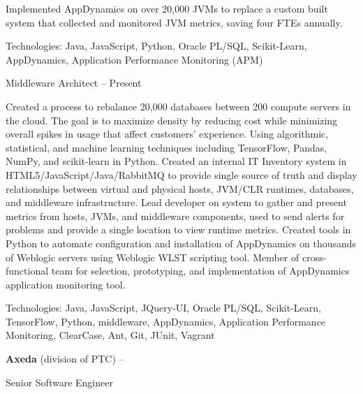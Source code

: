 \documentclass[letterpaper,MMMMyyyy,nonstopmode]{simpleresumecv}
\newif\ifLOCATION
\begin{document}
\begin{Body}
\begin{Detail}
\BulletItem
Implemented AppDynamics on over 20,000 JVMs to replace a custom built system that collected and monitored JVM metrics, saving four FTEs annually.

\Gap
Technologies: Java, JavaScript, Python, Oracle PL/SQL, Scikit-Learn, AppDynamics, Application Performance Monitoring (APM)
\end{Detail}

\BigGap

\iffalse %
\Entry
\href{http://www.paychex.com/}
{\textbf{Paychex}}
\ifLOCATION
\hfill 
Rochester, New York
\fi

Middleware Architect
\hfill
{} --
Present

\begin{Detail}
\BulletItem
Created a process to rebalance 20,000 databases between 200 compute servers in the cloud. The goal is to maximize density by reducing cost while minimizing overall spikes in usage that affect customers' experience. Using algorithmic, statistical, and machine learning techniques including TensorFlow, Pandas, NumPy, and scikit-learn in Python.
\BulletItem
Created an internal IT Inventory system in HTML5/JavaScript/Java/RabbitMQ to provide single source of truth and display relationships between virtual and physical hosts, JVM/CLR runtimes, databases, and middleware infrastructure.
\BulletItem
Lead developer on system to gather and present metrics from hosts, JVMs, and middleware components, used to send alerts for problems and provide a single location to view runtime metrics.
\BulletItem
Created tools in Python to automate configuration and installation of AppDynamics on thousands of Weblogic servers using Weblogic WLST scripting tool.
\BulletItem
Member of cross-functional team for selection, prototyping, and implementation of AppDynamics application monitoring tool. 

\Gap
Technologies: Java, JavaScript, JQuery-UI, Oracle PL/SQL, Scikit-Learn, TensorFlow, Python, middleware, AppDynamics, Application Performance Monitoring, ClearCase, Ant, Git, JUnit, Vagrant
\end{Detail}
\fi

\BigGap

\Entry
\textbf{Axeda} (division of PTC)
\hfill 
 --  

Senior Software Engineer
\ifLOCATION
\hfill
Rochester, New York
\fi


\end{Body}
\end{document}
